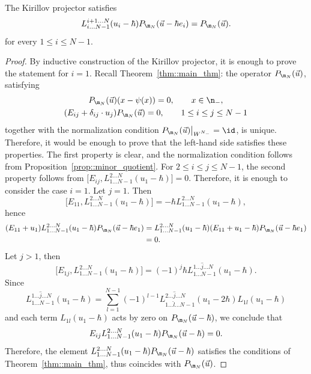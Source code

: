 	\begin{Proposition}
		\label{prop:proj_var_shift}
		The Kirillov projector satisfies
		\[
		L_{i\dots N-1}^{i+1 \dots N}(u_i - \hbar) P_{\m_N}(\vec{u} - \hbar e_i) = P_{\m_N}(\vec{u}).
		\]
		for every $1 \leq i \leq N-1$.
		\begin{proof}
			By inductive construction of the Kirillov projector, it is enough to prove the statement for $i=1$. Recall Theorem~\ref{thm::main_thm}: the operator $P_{\m_N}(\vec{u})$, satisfying
			\begin{gather*}
				P_{\m_N} (\vec{u})(x-\psi(x)) = 0,\qquad x\in \n_-, \\
				(E_{ij} + \delta_{ij}\cdot u_j) P_{\m_N} (\vec{u}) =0,\qquad 1\leq i \leq j \leq N-1
			\end{gather*}
			together with the normalization condition $P_{\m_N} (\vec{u}) \big|_{W^{N_-}} = \id$, is unique. Therefore, it would be enough to prove that the left-hand side satisfies these properties. The first property is clear, and the normalization condition follows from Proposition~\ref{prop::minor_quotient}. For $2 \leq i \leq j \leq N-1$, the second property follows from
$
			\bigl[E_{ij}, L_{1\dots N-1}^{2\dots N} (u_1-\hbar)\bigr] = 0$.
			Therefore, it is enough to consider the case $i=1$. Let $j=1$. Then
			\[
			\bigl[E_{11}, L_{1\dots N-1}^{2\dots N} (u_1-\hbar)\bigr] = -\hbar L_{1\dots N-1}^{2\dots N} (u_1-\hbar),
			\]
			hence
			\begin{align*}
				(E_{11} + u_1) L_{1\dots N-1}^{2\dots N} (u_1-\hbar) P_{\m_N}(\vec{u}-\hbar e_1)
				&=L_{1\dots N-1}^{2\dots N} (u_1-\hbar) (E_{11}+u_1-\hbar) P_{\m_N}(\vec{u}-\hbar e_1)\\& = 0.
			\end{align*}
			Let $j>1$, then
			\[
			\bigl[E_{1j}, L_{1\dots N-1}^{2\dots N}(u_1-\hbar)\bigr] = (-1)^{j} \hbar L_{1\dots N-1}^{1 \dots \hat{j} \dots N}(u_1-\hbar).
			\]
			Since
			\[
			L_{1\dots N-1}^{1 \dots \hat{j} \dots N}(u_1-\hbar) = \sum\limits_{l=1}^{N-1} (-1)^{l-1} L_{1\dots \hat{l} \dots N-1}^{2\dots \hat{j} \dots N}(u_1-2\hbar) L_{1l}(u_1-\hbar)
			\]
			and each term $L_{1l}(u_1-\hbar)$ acts by zero on $P_{\m_N}(\vec{u}-\hbar)$, we conclude that
			\[
			E_{ij}L_{1\dots N-1}^{2\dots N}(u_1-\hbar) P_{\m_N}(\vec{u}-\hbar) = 0.
			\]
			Therefore, the element
$
			L_{1\dots N-1}^{2\dots N}(u_1-\hbar) P_{\m_N}(\vec{u}-\hbar)
$
			satisfies the conditions of Theorem~\ref{thm::main_thm}, thus coincides with $P_{\m_N} (\vec{u})$.
		\end{proof}
	\end{Proposition}
	
